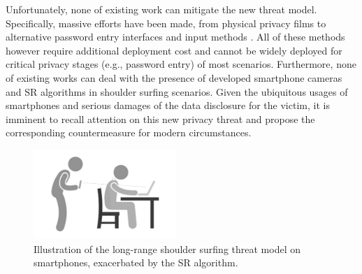 
Unfortunately, none of existing work can mitigate the new threat model. Specifically, massive efforts have been made, from physical privacy films to alternative password entry interfaces \cite{wiedenbeck2006design,papadopoulos2017illusionpin} and input methods \cite{kumar2007reducing}. All of these methods however require additional deployment cost \cite{Chun2019Keep} and cannot be widely deployed for critical privacy stages (e.g., password entry) of most scenarios. Furthermore, none of existing works can deal with the presence of developed smartphone cameras and SR algorithms in shoulder surfing scenarios. Given the ubiquitous usages of smartphones and serious damages of the data disclosure for the victim, it is imminent to recall attention on this new privacy threat and propose the corresponding countermeasure for modern circumstances.

\begin{figure}
	\centering
	\includegraphics[width=0.48\textwidth]{pic/intro.png}
    \caption{Illustration of the long-range shoulder surfing threat model on smartphones, exacerbated by the SR algorithm. }
	\label{illustration_of_system}
\end{figure}

